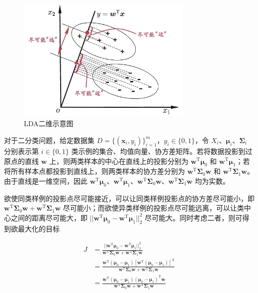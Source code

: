 \documentclass{ctexart}
\begin{document}
	\begin{figure}[htb]
		\centering
		\includegraphics[scale=1,height=6cm]{../image/LDA-example.png}
		\caption{LDA二维示意图}
		\label{LDA-example}
	\end{figure}

	对于二分类问题，给定数据集 $D=\{(\bm{x}_i,y_i)\}_{i=1}^{m}$，$y_i\in\{0,1\}$，令 $X_i$、$\bm{\mu}_i$、$\bm{\Sigma}_i$ 分别表示第 $i\in\{0,1\}$ 类示例的集合、均值向量、协方差矩阵。若将数据投影到过原点的直线 $\bm{w}$ 上，则两类样本的中心在直线上的投影分别为 $\bm{w}^\mathrm{T}\bm{\mu}_0$ 和 $\bm{w}^\mathrm{T}\bm{\mu}_1$；若将所有样本点都投影到直线上，则两类样本的协方差分别为 $\bm{w}^\mathrm{T}\bm{\Sigma}_0\bm{w}$ 和 $\bm{w}^\mathrm{T}\bm{\Sigma}_1\bm{w}$。由于直线是一维空间，因此 $\bm{w}^\mathrm{T}\bm{\mu}_0$、$\bm{w}^\mathrm{T}\bm{\mu}_1$、$\bm{w}^\mathrm{T}\bm{\Sigma}_0\bm{w}$、$\bm{w}^\mathrm{T}\bm{\Sigma}_1\bm{w}$ 均为实数。
	
	
	欲使同类样例的投影点尽可能接近，可以让同类样例投影点的协方差尽可能小，即 $\bm{w}^\mathrm{T}\bm{\Sigma}_0\bm{w}+\bm{w}^\mathrm{T}\bm{\Sigma}_1\bm{w}$ 尽可能小；而欲使异类样例的投影点尽可能远离，可以让类中心之间的距离尽可能大，即 $||\bm{w}^\mathrm{T}\bm{\mu}_0-\bm{w}^\mathrm{T}\bm{\mu}_1||_2^2$ 尽可能大。同时考虑二者，则可得到欲最大化的目标
	
	\begin{equation}
		\begin{aligned}
			J&=\frac{||\bm{w}^\mathrm{T}\bm{\mu}_0-\bm{w}^\mathrm{T}\bm{\mu}_1||_2^2}{\bm{w}^\mathrm{T}\bm{\Sigma}_0\bm{w}+\bm{w}^\mathrm{T}\bm{\Sigma}_1\bm{w}}\\
			&=\frac{\bm{w}^\mathrm{T}(\bm{\mu}_0-\bm{\mu}_1)[\bm{w}^\mathrm{T}(\bm{\mu}_0-\bm{\mu}_1)]^\mathrm{T}}{\bm{w}^\mathrm{T}\bm{\Sigma}_0\bm{w}+\bm{w}^\mathrm{T}\bm{\Sigma}_1\bm{w}}\\
			&=\frac{\bm{w}^\mathrm{T}(\bm{\mu}_0-\bm{\mu}_1)(\bm{\mu}_0-\bm{\mu}_1)^\mathrm{T}\bm{w}}{\bm{w}^\mathrm{T}\bm{\Sigma}_0\bm{w}+\bm{w}^\mathrm{T}\bm{\Sigma}_1\bm{w}}\label{Initial_J}
		\end{aligned}
	\end{equation}
	
\end{document}
